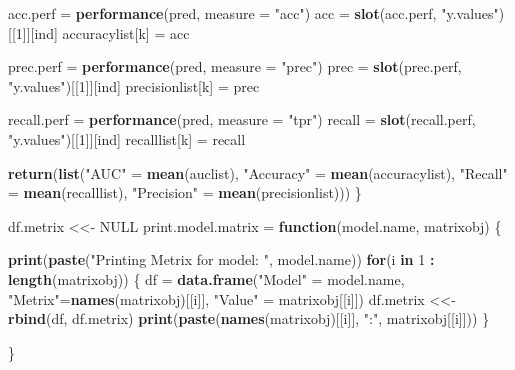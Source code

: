 \documentclass[]{article}
\newenvironment{Shaded}{\begin{snugshade}}{\end{snugshade}}
\newcommand{\ControlFlowTok}[1]{\textcolor[rgb]{0.13,0.29,0.53}{\textbf{#1}}}
\newcommand{\DataTypeTok}[1]{\textcolor[rgb]{0.13,0.29,0.53}{#1}}
\newcommand{\DecValTok}[1]{\textcolor[rgb]{0.00,0.00,0.81}{#1}}
\newcommand{\KeywordTok}[1]{\textcolor[rgb]{0.13,0.29,0.53}{\textbf{#1}}}
\newcommand{\NormalTok}[1]{#1}
\newcommand{\OperatorTok}[1]{\textcolor[rgb]{0.81,0.36,0.00}{\textbf{#1}}}
\newcommand{\OtherTok}[1]{\textcolor[rgb]{0.56,0.35,0.01}{#1}}
\newcommand{\StringTok}[1]{\textcolor[rgb]{0.31,0.60,0.02}{#1}}
\begin{document}
\begin{Shaded}
\begin{Highlighting}[]
\NormalTok{  acc.perf =}\StringTok{ }\KeywordTok{performance}\NormalTok{(pred, }\DataTypeTok{measure =} \StringTok{"acc"}\NormalTok{)}
\NormalTok{  acc =}\StringTok{ }\KeywordTok{slot}\NormalTok{(acc.perf, }\StringTok{"y.values"}\NormalTok{)[[}\DecValTok{1}\NormalTok{]][ind]}
\NormalTok{  accuracylist[k] =}\StringTok{ }\NormalTok{acc}
  
\NormalTok{  prec.perf =}\StringTok{ }\KeywordTok{performance}\NormalTok{(pred, }\DataTypeTok{measure =} \StringTok{"prec"}\NormalTok{)}
\NormalTok{  prec =}\StringTok{ }\KeywordTok{slot}\NormalTok{(prec.perf, }\StringTok{"y.values"}\NormalTok{)[[}\DecValTok{1}\NormalTok{]][ind]}
\NormalTok{  precisionlist[k] =}\StringTok{ }\NormalTok{prec}
  
\NormalTok{  recall.perf =}\StringTok{ }\KeywordTok{performance}\NormalTok{(pred, }\DataTypeTok{measure =} \StringTok{"tpr"}\NormalTok{)}
\NormalTok{  recall =}\StringTok{ }\KeywordTok{slot}\NormalTok{(recall.perf, }\StringTok{"y.values"}\NormalTok{)[[}\DecValTok{1}\NormalTok{]][ind]}
\NormalTok{  recalllist[k] =}\StringTok{ }\NormalTok{recall}
  
    
    
  \KeywordTok{return}\NormalTok{(}\KeywordTok{list}\NormalTok{(}\StringTok{"AUC"}\NormalTok{ =}\StringTok{ }\KeywordTok{mean}\NormalTok{(auclist), }\StringTok{"Accuracy"}\NormalTok{ =}\StringTok{ }\KeywordTok{mean}\NormalTok{(accuracylist),  }\StringTok{"Recall"}\NormalTok{ =}\StringTok{ }\KeywordTok{mean}\NormalTok{(recalllist), }\StringTok{"Precision"}\NormalTok{ =}\StringTok{ }\KeywordTok{mean}\NormalTok{(precisionlist)))}
\NormalTok{\}}

\NormalTok{df.metrix <<-}\StringTok{ }\OtherTok{NULL}
\NormalTok{print.model.matrix =}\StringTok{ }\ControlFlowTok{function}\NormalTok{(model.name, matrixobj)}
\NormalTok{\{}
  
  \KeywordTok{print}\NormalTok{(}\KeywordTok{paste}\NormalTok{(}\StringTok{"Printing Metrix for model: "}\NormalTok{, model.name))}
  \ControlFlowTok{for}\NormalTok{(i }\ControlFlowTok{in} \DecValTok{1} \OperatorTok{:}\StringTok{ }\KeywordTok{length}\NormalTok{(matrixobj))}
\NormalTok{  \{}
\NormalTok{    df =}\StringTok{ }\KeywordTok{data.frame}\NormalTok{(}\StringTok{"Model"}\NormalTok{ =}\StringTok{ }\NormalTok{model.name, }\StringTok{"Metrix"}\NormalTok{=}\KeywordTok{names}\NormalTok{(matrixobj)[[i]], }\StringTok{"Value"}\NormalTok{ =}\StringTok{ }\NormalTok{matrixobj[[i]])}
\NormalTok{    df.metrix <<-}\StringTok{ }\KeywordTok{rbind}\NormalTok{(df, df.metrix)}
    \KeywordTok{print}\NormalTok{(}\KeywordTok{paste}\NormalTok{(}\KeywordTok{names}\NormalTok{(matrixobj)[[i]], }\StringTok{":"}\NormalTok{, matrixobj[[i]]))}
\NormalTok{  \}}
  
\NormalTok{\}}
\end{Highlighting}
\end{Shaded}
\end{document}
